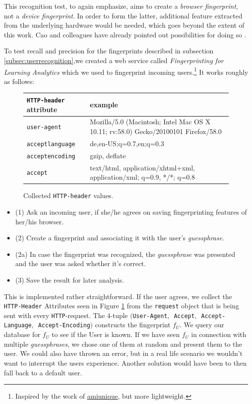 This recognition test, to again emphasize, aims to create a \textit{browser fingerprint}, not a \textit{device fingerprint}. In order to form the latter, additional feature extracted from the underlying hardware would be needed, which goes beyond the extent of this work. Cao and colleagues have already pointed out possibilities for doing so \cite{cao_cross-browser_2017}.

To test recall and precision for the fingerprints described in subsection \ref{subsec:userrecognition},we created a web service called \emph{Fingerprinting for Learning Analytics} which we used to fingerprint incoming users.\footnote{Inspired by the work of \href{amiunique.org}{amiunique}, but more lightweight.} It works roughly as follows:
\begin{figure}
\centering
\footnotesize
\begin{tabular}{|p{2cm}|p{3cm}|}
\hline
	\texttt{HTTP-header} attribute & example \\ \hline\hline
	\texttt{user-agent} & Mozilla/5.0 (Macintosh; Intel Mac OS X 10.11; rv:58.0) Gecko/20100101 Firefox/58.0\\\hline
	\texttt{accept\-language} & de,en-US;q=0.7,en;q=0.3 \\\hline
	\texttt{accept\-encoding} & gzip, deflate \\\hline
	\texttt{accept} & text/html, application/xhtml+xml, application/xml; q=0.9, */*; q=0.8 \\ \hline
\end{tabular}
\caption{Collected \texttt{HTTP-header} values.}
\label{met:fig:headers}
\vspace{-1in}
\end{figure}



\begin{itemize}
	\item (1) Ask an incoming user, if she/he agrees on saving fingerprinting features of her/his browser.
	\item (2) Create a fingerprint and associating it with the user's \emph{guessphrase}.
	\item (2a) In case the fingerprint was recognized, the \emph{guessphrase} was presented and the user was asked whether it's correct.
	\item (3) Save the result for later analysis.
\end{itemize}

This is implemented rather straightforward. If the user agrees, we collect the \texttt{HTTP-Header} Attributes seen in Figure \ref{met:fig:headers} from the \texttt{request} object that is being sent with every \texttt{HTTP}-request. The 4-tuple \texttt{$($User-Agent$,$ Accept$,$ Accept-Language$,$ Accept-Encoding$)$} constructs the fingerprint $f_U$. We query our database for $f_U$ to see if the User is known. If we have seen $f_U$ in connection with multiple \emph{guessphrases}, we chose one of them at random and present them to the user. We could also have thrown an error, but in a real life scenario we wouldn't want to interrupt the users experience. Another solution would have been to then fall back to a default user. 


